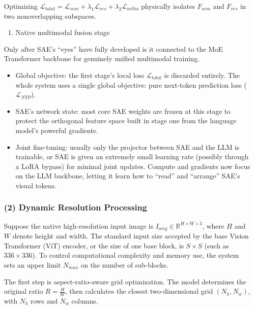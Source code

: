 Optimizing \(\mathcal{L}_{total}=\mathcal{L}_{sem}+\lambda_1\mathcal{L}_{res}+\lambda_2\mathcal{L}_{ortho}\) physically isolates \(F_{sem}\) and \(F_{res}\) in two nonoverlapping subspaces.

\begin{enumerate}
\def\labelenumi{(\arabic{enumi})}
\setcounter{enumi}{1}
\tightlist
\item
  Native multimodal fusion stage
\end{enumerate}

Only after SAE's ``eyes'' have fully developed is it connected to the MoE Transformer backbone for genuinely unified multimodal training.

\begin{itemize}
\tightlist
\item
  Global objective: the first stage's local loss \(\mathcal{L}_{total}\) is discarded entirely. The whole system uses a single global objective: pure next-token prediction loss (\(\mathcal{L}_{NTP}\)).
\item
  SAE's network state: most core SAE weights are frozen at this stage to protect the orthogonal feature space built in stage one from the language model's powerful gradients.
\item
  Joint fine-tuning: usually only the projector between SAE and the LLM is trainable, or SAE is given an extremely small learning rate (possibly through a LoRA bypass) for minimal joint updates. Compute and gradients now focus on the LLM backbone, letting it learn how to ``read'' and ``arrange'' SAE's visual tokens.
\end{itemize}

\hypertarget{dynamic-resolution-processing}{%
\subsubsection{(2) Dynamic Resolution Processing}\label{dynamic-resolution-processing}}

Suppose the native high-resolution input image is \(I_{orig}\in\mathbb{R}^{H\times W\times 3}\), where \(H\) and \(W\) denote height and width. The standard input size accepted by the base Vision Transformer (ViT) encoder, or the size of one base block, is \(S\times S\) (such as \(336\times336\)). To control computational complexity and memory use, the system sets an upper limit \(N_{max}\) on the number of sub-blocks.

The first step is aspect-ratio-aware grid optimization. The model determines the original ratio \(R=\frac{H}{W}\), then calculates the closest two-dimensional grid \((N_h,N_w)\), with \(N_h\) rows and \(N_w\) columns.

